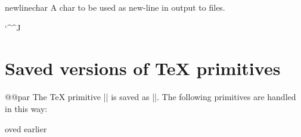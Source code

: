 \begin{docCommand*} {newlinechar}{ }
    A char to be used as new-line in output to files.
\end{docCommand*}

\begin{teX}
\newlinechar`\^^J
\end{teX}


 \section{Saved versions of \TeX{} primitives}


\begin{docCommand}{@@par}{}
The TeX primitive |\foo| is saved as |\@@foo|.
The following primitives are handled in this way:
\end{docCommand}

\begin{teX}
\let\@@par=\par
\let\@@input= moved earlier
\let\@@end=\end        %
\end{teX}

